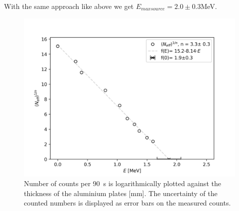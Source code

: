 With the same approach like above  we get $E_{maxsource}=2.0 \pm 0.3$\si{\mega\electronvolt}.


\begin{figure} [ht]
	\centering
	\includegraphics[width=400pt]{python/emax.png}
	\caption{Number of counts per \SI{90}{\second} is logarithmically plotted against the thickness of the aluminium plates [\si{\mm}]. The uncertainty of the counted numbers is displayed as error bars on the measured counts.}
	\label{fig::emax}
\end{figure}
